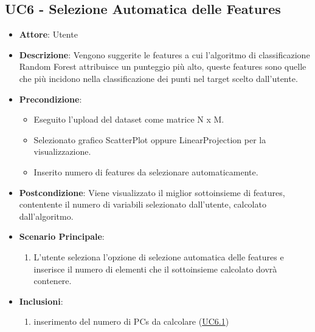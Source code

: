     \subsection{UC6 - Selezione Automatica delle Features}
    \begin{itemize}
    \item \textbf{Attore}: Utente
    \item \textbf{Descrizione}: Vengono suggerite le features a cui l'algoritmo di classificazione Random Forest attribuisce un punteggio più alto, queste features sono quelle che più incidono nella classificazione dei punti nel target scelto dall'utente.
    \item \textbf{Precondizione}: 
    \begin{itemize}
        \item Eseguito l'upload del dataset come matrice N x M.
        \item Selezionato grafico ScatterPlot oppure LinearProjection per la visualizzazione.
        \item Inserito numero di features da selezionare automaticamente.
    \end{itemize}
    \item \textbf{Postcondizione}: Viene visualizzato il miglior sottoinsieme di features, contentente il numero di variabili selezionato dall'utente, calcolato dall'algoritmo.
    \item \textbf{Scenario Principale}: 
    \begin{enumerate}
        \item L'utente seleziona l'opzione di selezione automatica delle features e inserisce il numero di elementi che il sottoinsieme calcolato dovrà contenere.
    \end{enumerate}
     \item \textbf{Inclusioni}:
        \begin{enumerate}
                \begin{enumerate}
                    \item inserimento del numero di PCs da calcolare (\hyperref[uc6.1]{UC6.1})
                \end{enumerate}
        \end{enumerate} 
    \end{itemize}
    
